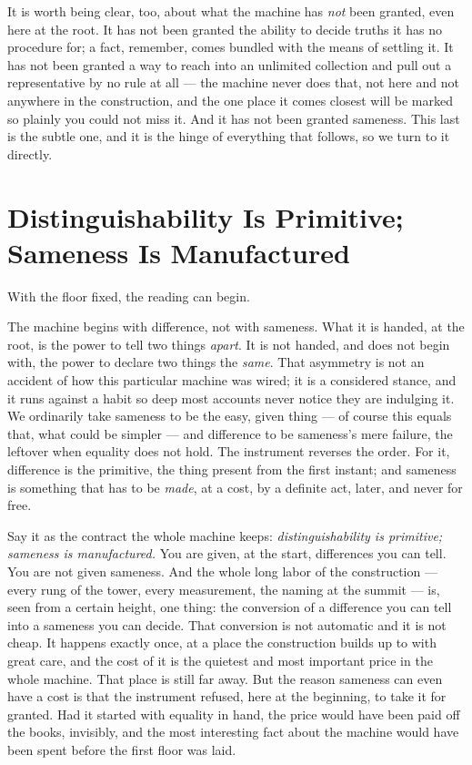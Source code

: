 It is worth being clear, too, about what the machine has \emph{not} been granted, even here at the root. It has
not been granted the ability to decide truths it has no procedure for; a fact, remember, comes bundled with the
means of settling it. It has not been granted a way to reach into an unlimited collection and pull out a
representative by no rule at all --- the machine never does that, not here and not anywhere in the construction, and the
one place it comes closest will be marked so plainly you could not miss it. And it has not been granted sameness.
This last is the subtle one, and it is the hinge of everything that follows, so we turn to it directly.

\section{Distinguishability Is Primitive; Sameness Is Manufactured}

With the floor fixed, the reading can begin.

The machine begins with difference, not with sameness. What it is handed, at the root, is the power to tell two
things \emph{apart}. It is not handed, and does not begin with, the power to declare two things the \emph{same}.
That asymmetry is not an accident of how this particular machine was wired; it is a considered stance, and it
runs against a habit so deep most accounts never notice they are indulging it. We ordinarily take sameness to be
the easy, given thing --- of course this equals that, what could be simpler --- and difference to be sameness's
mere failure, the leftover when equality does not hold. The instrument reverses the order. For it, difference is
the primitive, the thing present from the first instant; and sameness is something that has to be \emph{made}, at
a cost, by a definite act, later, and never for free.

Say it as the contract the whole machine keeps: \emph{distinguishability is primitive; sameness is manufactured.}
You are given, at the start, differences you can tell. You are not given sameness. And the whole long labor of the
construction --- every rung of the tower, every measurement, the naming at the summit --- is, seen from a certain
height, one thing: the conversion of a difference you can tell into a sameness you can decide. That conversion is
not automatic and it is not cheap. It happens exactly once, at a place the construction builds up to with great
care, and the cost of it is the quietest and most important price in the whole machine. That place is still far
away. But the reason sameness can even have a cost is that the instrument refused, here at the beginning, to take
it for granted. Had it started with equality in hand, the price would have been paid off the books, invisibly, and
the most interesting fact about the machine would have been spent before the first floor was laid.

